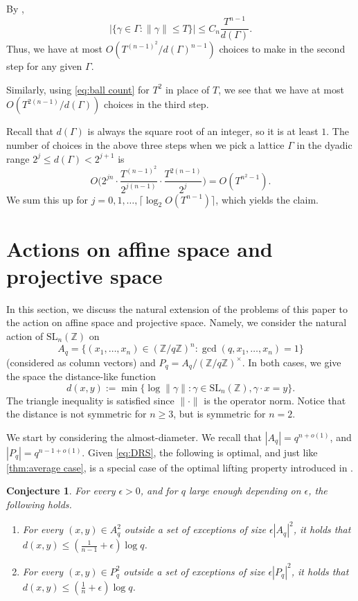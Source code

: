 \documentclass[12pt, a4paper]{amsart}
\numberwithin{equation}{section}
\newtheorem{conj}[theorem]{Conjecture}
\theoremstyle{definition}
\newcommand{\Z}{\mathbb{Z}}
\newcommand{\SL}{\mathrm{SL}}
\begin{document}
By \cite[Lemma~2]{schmidt1968asymptotic},
\begin{equation}\label{eq:ball count}
|\{\gamma\in \Gamma : \|\gamma\| \le T\}| \le C_n \frac{T^{n-1}}{d(\Gamma)}.
\end{equation}
Thus, we have at most $O(T^{(n-1)^2}/d(\Gamma)^{n-1})$ choices to make in the
second step for any given $\Gamma$.

Similarly, using \cref{eq:ball count} for $T^2$ in place of $T$, we
see that we have at most $O(T^{2(n-1)}/d(\Gamma))$ choices in the third step.

Recall that $d(\Gamma)$ is always the square root of an integer, so it is at least $1$.
The number of choices in the above three steps when we pick a lattice $\Gamma$ in 
the dyadic range $2^j\le d(\Gamma)<2^{j+1}$ is
\[
O\Big(2^{jn}\cdot\frac{T^{(n-1)^2}}{2^{j(n-1)}}\cdot\frac{T^{2(n-1)}}{2^j}\Big)
=O(T^{n^2-1}).
\]
We sum this up for $j=0,1,\ldots, \lceil\log_2 O(T^{n-1})\rceil$, which yields the claim.
 


\section{\label{sec:affine and projective}Actions on affine space and projective space}

In this section, we discuss the natural extension of the problems of this paper to the action on affine space and projective space. Namely, we consider the natural action of $\SL_n(\Z)$ on
\[
A_q = \{(x_1,\ldots,x_n)\in(\Z/q\Z)^n:\gcd(q,x_1,\ldots,x_n)=1\}
\]
(considered as column vectors) and $P_q = A_q/(\Z/q\Z)^\times$. In both cases, we give the space the distance-like function
\[
d(x,y):= \min\{\log\|\gamma\|: \gamma \in \SL_n(\Z), \gamma\cdot x=y\}.
\]
The triangle inequality is satisfied since $\|\cdot\|$ is the operator norm. Notice that the distance is not symmetric for $n\ge3$, but is symmetric for $n=2$. 

We start by considering the almost-diameter. We recall that $|A_q|= q^{n+o(1)}$, and $|P_q|=q^{n-1+o(1)}$. Given \cref{eq:DRS}, the following is optimal, and just like \cref{thm:average case}, is a special case of the optimal lifting property introduced in \cite{golubev2023sarnak}.
\begin{conj}
    For every $\epsilon>0$, and for $q$ large enough depending on $\epsilon$, the following holds.
    \begin{enumerate}
        \item For every $(x,y)\in A_q^2$ outside a set of exceptions of size $\epsilon |A_q|^2$, it holds that $d(x,y)\le (\frac{1}{n-1}+\epsilon)\log q$.
        \item For every $(x,y)\in P_q^2$ outside a set of exceptions of  size $\epsilon |P_q|^2$, it holds that $d(x,y)\le (\frac{1}{n}+\epsilon)\log q$.
    \end{enumerate}
\end{conj}
\end{document}

